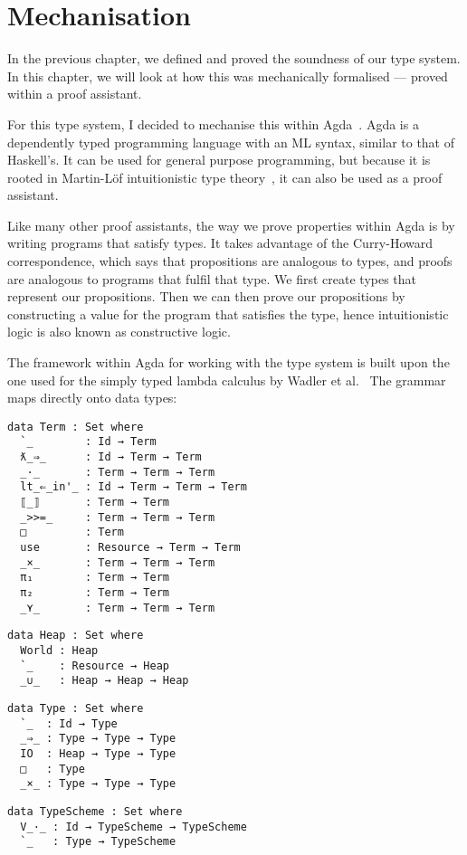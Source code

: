 \chapter{Mechanisation}\label{cha:mechanisation}

In the previous chapter, we defined and proved the soundness of our
type system. In this chapter, we will look at how this was
mechanically formalised --- proved within a proof assistant.

For this type system, I decided to mechanise this within
Agda~\cite{norell2009}. Agda is a dependently typed programming
language with an ML syntax, similar to that of Haskell's. It can be
used for general purpose programming, but because it is rooted in
Martin-Löf intuitionistic type theory~\cite{martin-lof1984}, it can
also be used as a proof assistant.

Like many other proof assistants, the way we prove properties within
Agda is by writing programs that satisfy types. It takes advantage of
the Curry-Howard correspondence, which says that propositions are
analogous to types, and proofs are analogous to programs that fulfil
that type. We first create types that represent our
propositions. Then we can then prove our propositions by constructing
a value for the program that satisfies the type, hence intuitionistic
logic is also known as constructive logic.

The framework within Agda for working with the type system is built
upon the one used for the simply typed lambda calculus by Wadler et
al.~\cite{wadler2018} The grammar maps directly onto
data types:
\begin{verbatim}
data Term : Set where
  `_        : Id → Term
  ƛ_⇒_      : Id → Term → Term
  _·_       : Term → Term → Term
  lt_⇐_in'_ : Id → Term → Term → Term
  ⟦_⟧       : Term → Term
  _>>=_     : Term → Term → Term
  □         : Term
  use       : Resource → Term → Term
  _×_       : Term → Term → Term
  π₁        : Term → Term
  π₂        : Term → Term
  _⋎_       : Term → Term → Term
\end{verbatim}
\begin{verbatim}
data Heap : Set where
  World : Heap
  `_    : Resource → Heap
  _∪_   : Heap → Heap → Heap
\end{verbatim}
\begin{verbatim}
data Type : Set where
  `_  : Id → Type
  _⇒_ : Type → Type → Type
  IO  : Heap → Type → Type
  □   : Type
  _×_ : Type → Type → Type
\end{verbatim}
\begin{verbatim}
data TypeScheme : Set where
  V_·_ : Id → TypeScheme → TypeScheme
  `_   : Type → TypeScheme
\end{verbatim}

